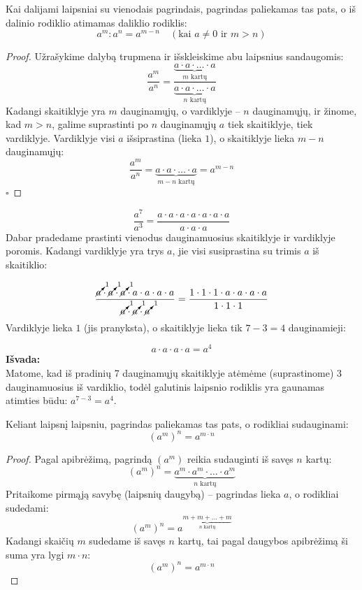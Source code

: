 \documentclass[11pt,a4paper]{scrartcl}
\begin{document}
\begin{property}
Kai dalijami laipsniai su vienodais pagrindais, pagrindas paliekamas tas pats, o iš dalinio rodiklio atimamas daliklio rodiklis:
$$a^m : a^n = a^{m-n} \quad (\text{kai } a \neq 0 \text{ ir } m > n)$$
\end{property}
\begin{proof}
Užrašykime dalybą trupmena ir išskleiskime abu laipsnius sandaugomis:
$$\frac{a^m}{a^n} = \frac{\underbrace{a \cdot a \cdot \dots \cdot a}_{m \text{ kartų}}}{\underbrace{a \cdot a \cdot \dots \cdot a}_{n \text{ kartų}}}$$
Kadangi skaitiklyje yra $m$ dauginamųjų, o vardiklyje – $n$ dauginamųjų, ir žinome, kad $m > n$, galime suprastinti po $n$ dauginamųjų $a$ tiek skaitiklyje, tiek vardiklyje. Vardiklyje visi $a$ išsiprastina (lieka $1$), o skaitiklyje lieka $m - n$ dauginamųjų:
$$\frac{a^m}{a^n} = \underbrace{a \cdot a \cdot \dots \cdot a}_{m-n \text{ kartų}} = a^{m-n}$$
$\square$
\end{proof}
\begin{example}
$$\frac{a^7}{a^3} = \frac{a \cdot a \cdot a \cdot a \cdot a \cdot a \cdot a}{a \cdot a \cdot a}$$
Dabar pradedame prastinti vienodus dauginamuosius skaitiklyje ir vardiklyje poromis. Kadangi vardiklyje yra trys $a$, jie visi susiprastina su trimis $a$ iš skaitiklio:

$$\frac{\cancelto{1}{a} \cdot \cancelto{1}{a} \cdot \cancelto{1}{a} \cdot a \cdot a \cdot a \cdot a}{\cancelto{1}{a} \cdot \cancelto{1}{a} \cdot \cancelto{1}{a}} = \frac{1 \cdot 1 \cdot 1 \cdot a \cdot a \cdot a \cdot a}{1 \cdot 1 \cdot 1}$$
Vardiklyje lieka $1$ (jis pranyksta), o skaitiklyje lieka tik $7 - 3 = 4$ dauginamieji:

$$a \cdot a \cdot a \cdot a = a^4$$
\textbf{Išvada:} \\
Matome, kad iš pradinių 7 dauginamųjų skaitiklyje atėmėme (suprastinome) 3 dauginamuosius iš vardiklio, todėl galutinis laipsnio rodiklis yra gaunamas atimties būdu: $a^{7-3} = a^4$.
\end{example}    

\begin{property}
Keliant laipsnį laipsniu, pagrindas paliekamas tas pats, o rodikliai sudauginami:
$$(a^m)^n = a^{m \cdot n}$$
\end{property}
\begin{proof}
Pagal apibrėžimą, pagrindą $(a^m)$ reikia sudauginti iš savęs $n$ kartų:
$$(a^m)^n = \underbrace{a^m \cdot a^m \cdot \dots \cdot a^m}_{n \text{ kartų}}$$
Pritaikome pirmąją savybę (laipsnių daugybą) – pagrindas lieka $a$, o rodikliai sudedami:
$$(a^m)^n = a^{\underbrace{m + m + \dots + m}_{n \text{ kartų}}}$$
Kadangi skaičių $m$ sudedame iš savęs $n$ kartų, tai pagal daugybos apibrėžimą ši suma yra lygi $m \cdot n$:
$$(a^m)^n = a^{m \cdot n}$$
\end{proof}
\end{document}

